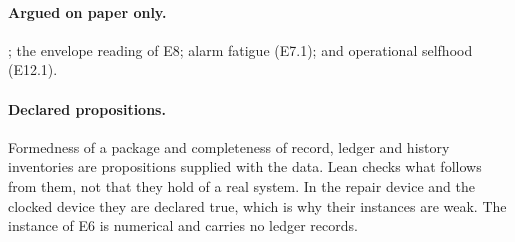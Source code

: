 \paragraph{Argued on paper only.} ; the
envelope reading of E8; alarm fatigue (E7.1); and operational selfhood (E12.1).

\paragraph{Declared propositions.} Formedness of a package and completeness of record, ledger and
history inventories are propositions supplied with the data. Lean checks what follows from them,
not that they hold of a real system. In the repair device and the clocked device they are declared
true, which is why their instances are weak. The instance of E6 is numerical and carries no ledger
records.
